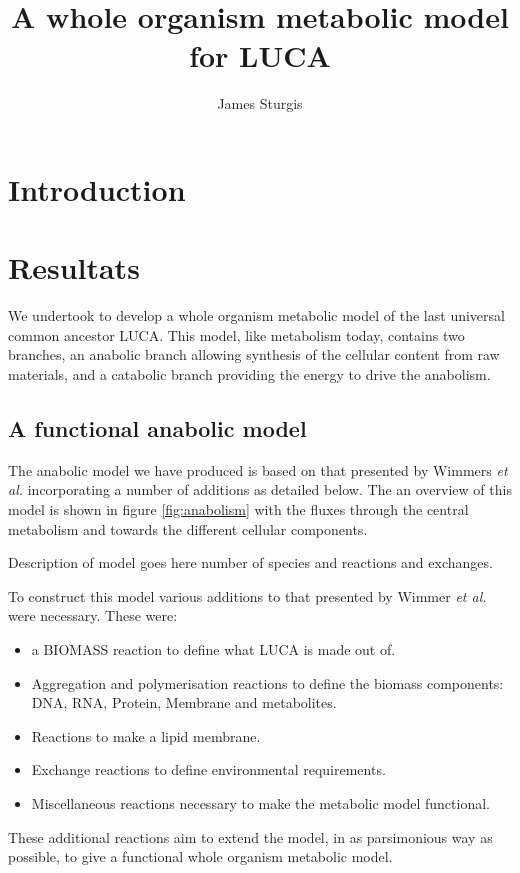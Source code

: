 \documentclass[10pt]{article}
\author{James Sturgis}
\title{A whole organism metabolic model for LUCA}
\begin{document}
\maketitle
\begin{abstract}
 
\end{abstract} 
\section*{Introduction}
\section*{Resultats}
We undertook to develop a whole organism metabolic model of the last universal common ancestor LUCA. This model, like metabolism today, contains two branches, an anabolic branch allowing synthesis of the cellular content from raw materials, and a catabolic branch providing the energy to drive the anabolism.
\subsection*{A functional anabolic model}
The anabolic model we have produced is based on that presented by Wimmers \textit{et al.} \cite{Wimmers} incorporating a number of additions as detailed below.
The an overview of this model is shown in figure \ref{fig:anabolism} with the fluxes through the central metabolism and towards the different cellular components.

Description of model goes here number of species and reactions and exchanges.

To construct this model various additions to that presented by Wimmer \textit{et al.} \cite{Wimmers} were necessary. These were:
\begin{itemize}
 \item a BIOMASS reaction to define what LUCA is made out of.
 \item Aggregation and polymerisation reactions to define the biomass components: DNA, RNA, Protein, Membrane and metabolites.
 \item Reactions to make a lipid membrane.
 \item Exchange reactions to define environmental requirements.
 \item Miscellaneous reactions necessary to make the metabolic model functional.
\end{itemize}
These additional reactions aim to extend the model, in as parsimonious way as possible, to give a functional whole organism metabolic model.
\end{document}

